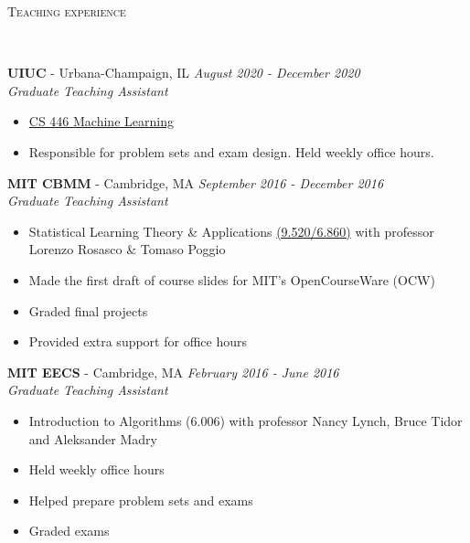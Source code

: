 \documentclass{article}
\newenvironment{changemargin}[2]{%
  \begin{list}{}{%
    \setlength{\topsep}{0pt}%
    \setlength{\leftmargin}{#1}%
    \setlength{\rightmargin}{#2}%
    \setlength{\listparindent}{\parindent}%
    \setlength{\itemindent}{\parindent}%
    \setlength{\parsep}{\parskip}%
  }%
  \item[]}{\end{list}
}
\newcommand{\lineover}{
	\begin{changemargin}{-0.05in}{-0.05in}
		\vspace*{-8pt}
		\hrulefill \\
		\vspace*{-2pt}
	\end{changemargin}
}
\newcommand{\header}[1]{
	\begin{changemargin}{-0.5in}{-0.5in}
		\scshape{#1}\\
  	\lineover
	\end{changemargin}
}
\newenvironment{body} {
	\vspace*{-16pt}
	\begin{changemargin}{-0.25in}{-0.5in}
  }	
	{\end{changemargin}
}
\begin{document}
\header{Teaching experience}
\begin{body}
	\vspace{16pt}
	
	\textbf{UIUC} - Urbana-Champaign, IL \hfill \emph{August 2020 - December 2020}\\
	\emph{Graduate Teaching Assistant}\\
	\vspace*{-3pt}
	\begin{itemize} \itemsep -2pt
		\item \href{https://relate.cs.illinois.edu/course/CS446-fa20/}{CS 446 Machine Learning}
		\item Responsible for problem sets and exam design. Held weekly office hours.
	\end{itemize}
    
    \textbf{MIT CBMM} - Cambridge, MA \hfill \emph{September 2016 - December 2016}\\
	\emph{Graduate Teaching Assistant}\\
	\vspace*{-3pt}
	\begin{itemize} \itemsep -2pt
		\item Statistical Learning Theory \& Applications \href{http://www.mit.edu/~9.520/fall16/}{(9.520/6.860)} with professor Lorenzo Rosasco \& Tomaso Poggio
        \item Made the first draft of course slides for MIT's OpenCourseWare (OCW)
        \item Graded final projects
        \item Provided extra support for office hours
	\end{itemize}

   	\textbf{MIT EECS} - Cambridge, MA \hfill \emph{February 2016 - June 2016}\\
	\emph{Graduate Teaching Assistant}\\
	\vspace*{-3pt}
	\begin{itemize} \itemsep -2pt
        \item Introduction to Algorithms (6.006) with professor Nancy Lynch, Bruce Tidor and Aleksander Madry
        \item Held weekly office hours 
        \item Helped prepare problem sets and exams
        \item Graded exams
	\end{itemize}
    

\end{body}
\end{document}
